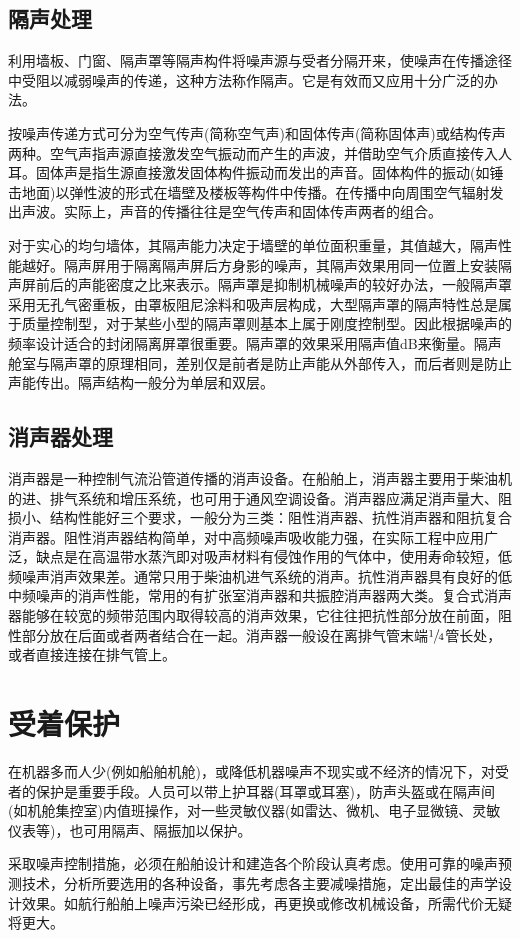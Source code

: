 \documentclass[a4paper]{article}
\begin{document}
\subsection{隔声处理}    
利用墙板、门窗、隔声罩等隔声构件将噪声源与受者分隔开来，使噪声在传播途径中受阻以减弱噪声的传递，这种方法称作隔声。它是有效而又应用十分广泛的办法。
\par 按噪声传递方式可分为空气传声(简称空气声)和固体传声(简称固体声)或结构传声两种。空气声指声源直接激发空气振动而产生的声波，并借助空气介质直接传入人耳。固体声是指生源直接激发固体构件振动而发出的声音。固体构件的振动(如锤击地面)以弹性波的形式在墙壁及楼板等构件中传播。在传播中向周围空气辐射发出声波。实际上，声音的传播往往是空气传声和固体传声两者的组合。
\par 对于实心的均匀墙体，其隔声能力决定于墙壁的单位面积重量，其值越大，隔声性能越好。隔声屏用于隔离隔声屏后方身影的噪声，其隔声效果用同一位置上安装隔声屏前后的声能密度之比来表示。隔声罩是抑制机械噪声的较好办法，一般隔声罩采用无孔气密重板，由罩板阻尼涂料和吸声层构成，大型隔声罩的隔声特性总是属于质量控制型，对于某些小型的隔声罩则基本上属于刚度控制型。因此根据噪声的频率设计适合的封闭隔离屏罩很重要。隔声罩的效果采用隔声值dB来衡量。隔声舱室与隔声罩的原理相同，差别仅是前者是防止声能从外部传入，而后者则是防止声能传出。隔声结构一般分为单层和双层。
\subsection{消声器处理}   
消声器是一种控制气流沿管道传播的消声设备。在船舶上，消声器主要用于柴油机的进、排气系统和增压系统，也可用于通风空调设备。消声器应满足消声量大、阻损小、结构性能好三个要求，一般分为三类：阻性消声器、抗性消声器和阻抗复合消声器。阻性消声器结构简单，对中高频噪声吸收能力强，在实际工程中应用广泛，缺点是在高温带水蒸汽即对吸声材料有侵蚀作用的气体中，使用寿命较短，低频噪声消声效果差。通常只用于柴油机进气系统的消声。抗性消声器具有良好的低中频噪声的消声性能，常用的有扩张室消声器和共振腔消声器两大类。复合式消声器能够在较宽的频带范围内取得较高的消声效果，它往往把抗性部分放在前面，阻性部分放在后面或者两者结合在一起。消声器一般设在离排气管末端$\sfrac{1}{4}$管长处，或者直接连接在排气管上。
\section{受着保护}
在机器多而人少(例如船舶机舱)，或降低机器噪声不现实或不经济的情况下，对受者的保护是重要手段。人员可以带上护耳器(耳罩或耳塞)，防声头盔或在隔声间(如机舱集控室)内值班操作，对一些灵敏仪器(如雷达、微机、电子显微镜、灵敏仪表等)，也可用隔声、隔振加以保护。\\
\par 采取噪声控制措施，必须在船舶设计和建造各个阶段认真考虑。使用可靠的噪声预测技术，分析所要选用的各种设备，事先考虑各主要减噪措施，定出最佳的声学设计效果。如航行船舶上噪声污染已经形成，再更换或修改机械设备，所需代价无疑将更大。
\end{document}
